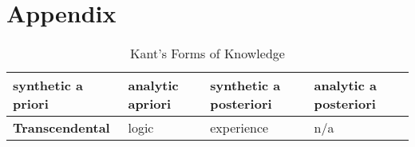 \chapter{Appendix}

\begin{table}[h!]
    \centering
    \begin{tabularx}{1.05\textwidth} { 
      | X 
      | X 
      | X 
      | X | }
     \hline
     synthetic a priori & analytic apriori & synthetic a posteriori & analytic a posteriori \\
     \hline
     \textbf{Trans\-cendental} & logic & experience & n/a \\
    \hline
    \end{tabularx}
    \caption{Kant's Forms of Knowledge}
    \label{table:1}
\end{table}